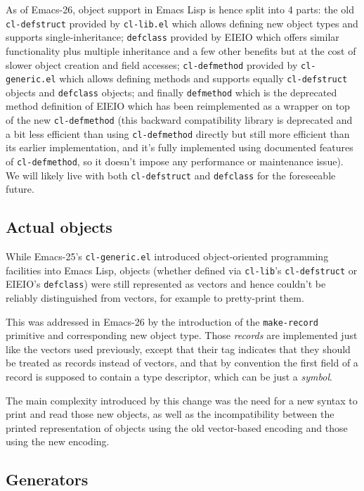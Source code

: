 \documentclass[format=acmsmall, review]{acmart}
\newcommand \Elisp {Emacs Lisp}
\begin{document}
As of Emacs-26, object support in \Elisp{} is hence split into 4 parts: the
old \texttt{cl-defstruct} provided by \texttt{cl-lib.el} which allows
defining new object types and supports single-inheritance; \texttt{defclass}
provided by EIEIO which offers similar functionality plus multiple
inheritance and a few other benefits but at the cost of slower object
creation and field accesses; \texttt{cl-defmethod} provided by
\texttt{cl-generic.el} which allows defining methods and supports equally
\texttt{cl-defstruct} objects and \texttt{defclass} objects; and finally
\texttt{defmethod} which is the deprecated method definition of EIEIO which
has been reimplemented as a wrapper on top of the new \texttt{cl-defmethod}
(this backward compatibility library is deprecated and a bit less efficient
than using \texttt{cl-defmethod} directly but still more efficient than its
earlier implementation, and it's fully implemented using documented features
of \texttt{cl-defmethod}, so it doesn't impose any performance or
maintenance issue).  We will likely live with both \texttt{cl-defstruct} and
\texttt{defclass} for the foreseeable future.

\subsection{Actual objects}  %
\label{sec:actual-objects}

While Emacs-25's \texttt{cl-generic.el} introduced object-oriented
programming facilities into \Elisp{}, objects (whether defined via
\texttt{cl-lib}'s \texttt{cl-defstruct} or EIEIO's \texttt{defclass}) were
still represented as vectors and hence couldn't be reliably distinguished
from vectors, for example to pretty-print them.

This was addressed in Emacs-26 by the introduction of the
\texttt{make-record} primitive and corresponding new object type.
Those \emph{records} are implemented just like the vectors used previously,
except that their tag indicates that they should be treated as records
instead of vectors, and that by convention the first field of a record is
supposed to contain a type descriptor, which can be just a \emph{symbol}.

The main complexity introduced by this change was the need for a new syntax
to print and read those new objects, as well as the incompatibility between
the printed representation of objects using the old vector-based encoding
and those using the new encoding.

\subsection{Generators}
\label{sec:generators}
\end{document}
